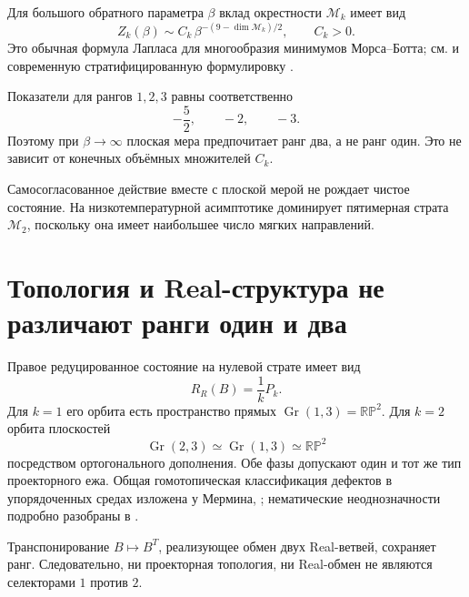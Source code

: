 Для большого обратного параметра $\beta$ вклад окрестности
$\mathcal M_k$ имеет вид
\begin{equation}
 Z_k(\beta)\sim C_k\,
 \beta^{-(9-\dim\mathcal M_k)/2},
 \qquad C_k>0.
 \label{eq:v6-morse-bott-laplace-rank-weight}
\end{equation}
Это обычная формула Лапласа для многообразия минимумов Морса--Ботта; см.
 и современную стратифицированную формулировку
.

Показатели для рангов $1,2,3$ равны соответственно
\begin{equation}
 -\frac52,\qquad -2,\qquad -3.
\end{equation}
Поэтому при $\beta\to\infty$ плоская мера предпочитает ранг два, а не
ранг один. Это не зависит от конечных объёмных множителей $C_k$.

\begin{theorem}
Самосогласованное действие вместе с плоской мерой не рождает чистое
состояние. На низкотемпературной асимптотике доминирует пятимерная страта
$\mathcal M_2$, поскольку она имеет наибольшее число мягких направлений.
\end{theorem}

\section{Топология и Real-структура не различают ранги один и два}

Правое редуцированное состояние на нулевой страте имеет вид
\begin{equation}
 R_R(B)=\frac1kP_k.
\end{equation}
Для $k=1$ его орбита есть пространство прямых
$\operatorname{Gr}(1,3)=\mathbb{RP}^2$. Для $k=2$ орбита плоскостей
\begin{equation}
 \operatorname{Gr}(2,3)\simeq\operatorname{Gr}(1,3)
 \simeq\mathbb{RP}^2
\end{equation}
посредством ортогонального дополнения. Обе фазы допускают один и тот же
тип проекторного ежа. Общая гомотопическая классификация дефектов в
упорядоченных средах изложена у Мермина,
; нематические неоднозначности
подробно разобраны в
.

Транспонирование $B\mapsto B^T$, реализующее обмен двух Real-ветвей,
сохраняет ранг. Следовательно, ни проекторная топология, ни Real-обмен не
являются селекторами $1$ против $2$.

